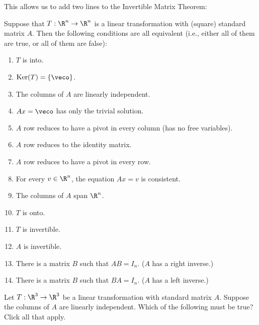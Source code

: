 This allows us to add two lines to the Invertible Matrix Theorem: 

{}  
Suppose that $T: \R^n \rightarrow \R^n$ is a linear transformation
with (square) standard matrix $A$.  Then the following conditions are all equivalent (i.e., either all of
them are true, or all of them are false):

\begin{enumerate}
\item $T$ is into.
\item $\mathrm{Ker}(T) = \{ \veco \}$.  
\item The columns of $A$ are linearly independent. 
\item $Ax = \veco$ has only the trivial solution.
\item $A$ row reduces to have a pivot in every column (has no free variables).  
\item $A$ row reduces to the identity matrix.  
\item $A$ row reduces to have a pivot in every row.  
\item For every $v\in \R^n$, the equation $Ax = v$ is consistent.
\item The columns of $A$ span $\R^n$.  
\item $T$ is onto.  
\item $T$ is invertible.
\item $A$ is invertible.
\item There is a matrix $B$ such that $AB = I_n$.  ($A$ has a right inverse.)
\item There is a matrix $B$ such that $BA = I_n$.  ($A$ has a left inverse.)  

\end{enumerate}



\endedxtext


\endedxvertical




Let $T: \R^3 \rightarrow \R^3$ be a linear transformation with standard matrix $A$.  Suppose the columns of $A$ are linearly
independent.  Which of the following must be true?  Click all that apply.  



\edXsolution{
}

\endedxproblem


\endedxvertical